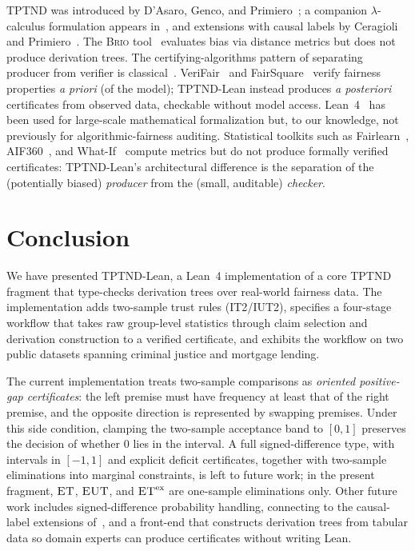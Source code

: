 \documentclass{ceurart}
\begin{document}
TPTND was introduced by D'Asaro, Genco, and
Primiero~\cite{dasaro2025tptnd}; a companion $\lambda$-calculus
formulation appears in~\cite{genco2023lambda}, and extensions
with causal labels by Ceragioli and
Primiero~\cite{ceragioli2025causal1,ceragioli2025causal2}.
The \textsc{Brio} tool~\cite{brio2023} evaluates bias via distance
metrics but does not produce derivation trees.
The certifying-algorithms pattern of separating producer from
verifier is classical~\cite{necula1997pcc,mcconnell2011certifying}.
VeriFair~\cite{bastani2019verifair} and
FairSquare~\cite{albarghouthi2017fairsquare} verify fairness
properties \emph{a priori} (of the model); TPTND-Lean instead produces
\emph{a posteriori} certificates from observed data, checkable
without model access.  Lean~4~\cite{moura2021lean4} has been used
for large-scale mathematical formalization but, to our knowledge,
not previously for algorithmic-fairness auditing.  Statistical
toolkits such as Fairlearn~\cite{bird2020fairlearn},
AIF360~\cite{bellamy2019aif360}, and
What-If~\cite{wexler2019whatif} compute metrics but do not
produce formally verified certificates: TPTND-Lean's architectural
difference is the separation of the (potentially biased)
\emph{producer} from the (small, auditable) \emph{checker}.

\section{Conclusion}\label{sec:concl}

We have presented TPTND-Lean, a Lean~4 implementation of a core TPTND
fragment that type-checks derivation trees over real-world
fairness data.
The implementation adds two-sample trust rules (\textsc{IT2}/\textsc{IUT2}),
specifies a four-stage workflow that takes raw group-level
statistics through claim selection and derivation construction
to a verified certificate, and exhibits the workflow on two
public datasets spanning criminal justice and mortgage lending.

The current implementation treats two-sample comparisons as
\emph{oriented positive-gap certificates}: the left premise must
have frequency at least that of the right premise, and the
opposite direction is represented by swapping premises.  Under
this side condition, clamping the two-sample acceptance band to
$[0,1]$ preserves the decision of whether $0$ lies in the
interval.  A full signed-difference type, with intervals in
$[-1,1]$ and explicit deficit certificates, together with
two-sample eliminations into marginal constraints, is left to
future work; in the present fragment, $\textsc{ET}$,
$\textsc{EUT}$, and $\textsc{ET}^{\text{ex}}$ are one-sample
eliminations only.
Other future work includes signed-difference probability handling,
connecting to the causal-label extensions
of~\cite{ceragioli2025causal1}, and a front-end that constructs
derivation trees from tabular data so domain experts can produce
certificates without writing Lean.
\end{document}
